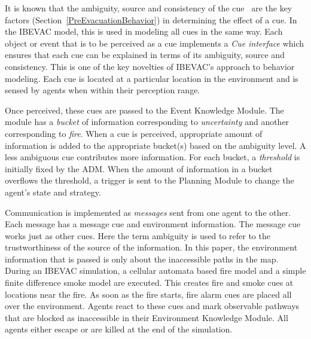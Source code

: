 It is known that the ambiguity, source and consistency of the cue~\cite{Kuligowski:2005tt,Sime:1983uy,Tong:1985wn} are the key factors (Section~\ref{PreEvacuationBehavior}) in determining the effect of a cue. In the IBEVAC model, this is used in modeling all cues in the same way. Each object or event that is to be perceived as a cue implements a \emph{Cue interface} which ensures that each cue can be explained in terms of its ambiguity, source and consistency. This is one of the key novelties of IBEVAC's approach to behavior modeling. Each cue is located at a particular location in the environment and is sensed by agents when within their perception range.

Once perceived, these cues are passed to the Event Knowledge Module. The  module has a \emph{bucket} of information corresponding to \emph{uncertainty} and another corresponding to \emph{fire}. When a cue is perceived, appropriate amount of information is added to the appropriate bucket(s) based on the ambiguity level. A less ambiguous cue contributes more information. For each bucket, a \emph{threshold} is initially fixed by the ADM. When the amount of information in a bucket overflows the threshold, a trigger is sent to the Planning Module to change the agent's state and strategy.

Communication is implemented as \emph{messages} sent from one agent to the other. Each message has a message cue and environment information. The message cue works just as other cues. Here the term ambiguity is used to refer to the trustworthiness of the source of the information. In this paper, the environment information that is passed is only about the inaccessible paths in the map. %
During an IBEVAC simulation, a cellular automata based fire model and a simple finite difference smoke model are executed. This creates fire and smoke cues at locations near the fire. As soon as the fire starts, fire alarm cues are placed all over the environment. Agents react to these cues and mark observable pathways that are blocked as inaccessible in their Environment Knowledge Module. All agents either escape or are killed at the end of the simulation.



